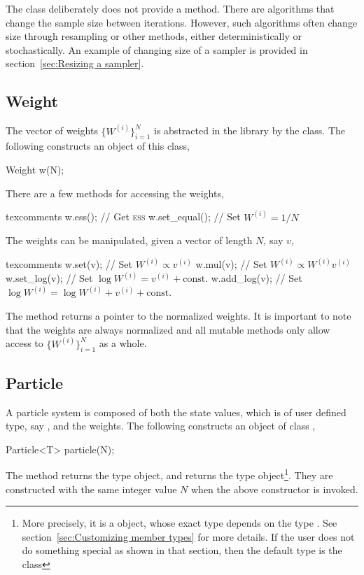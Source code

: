 The  class deliberately does not provide a
 method. There are algorithms that change the sample size
between iterations. However, such algorithms often change size through
resampling or other methods, either deterministically or stochastically. An
example of changing size of a sampler is provided in section~\ref{sec:Resizing
  a sampler}.

\subsection{Weight}
\label{sub:Weight}

The vector of weights $\{W^{(i)}\}_{i=1}^N$ is abstracted in the library by the
 class. The following constructs an object of this class,
\begin{cppcode}
  Weight w(N);
\end{cppcode}
There are a few methods for accessing the weights,
\begin{cppcode*}{texcomments}
  w.ess();          // Get {\normalfont\textsc{ess}}
  w.set_equal();    // Set $W^{(i)} = 1/N$
\end{cppcode*}
The weights can be manipulated, given a vector of length $N$, say $v$,
\begin{cppcode*}{texcomments}
  w.set(v);         // Set $W^{(i)} \propto v^{(i)}$
  w.mul(v);         // Set $W^{(i)} \propto W^{(i)} v^{(i)}$
  w.set_log(v);     // Set $\log W^{(i)} = v^{(i)} + \text{const.}$
  w.add_log(v);     // Set $\log W^{(i)} = \log W^{(i)} + v^{(i)} + \text{const.}$
\end{cppcode*}
The method  returns a pointer to the normalized weights. It
is important to note that the weights are always normalized and all mutable
methods only allow access to $\{W^{(i)}\}_{i=1}^N$ as a whole.

\subsection{Particle}
\label{sub:Particle}

A particle system is composed of both the state values, which is of user
defined type, say , and the weights. The following constructs an
object of class ,
\begin{cppcode}
  Particle<T> particle(N);
\end{cppcode}
The method  returns the type  object,
and  returns the type 
object\footnote{More precisely, it is a 
  object, whose exact type depends on the type . See
  section~\ref{sec:Customizing member types} for more details. If the user does
  not do something special as shown in that section, then the default type is
  the class }. They are constructed with the same integer
value $N$ when the above constructor is invoked.


